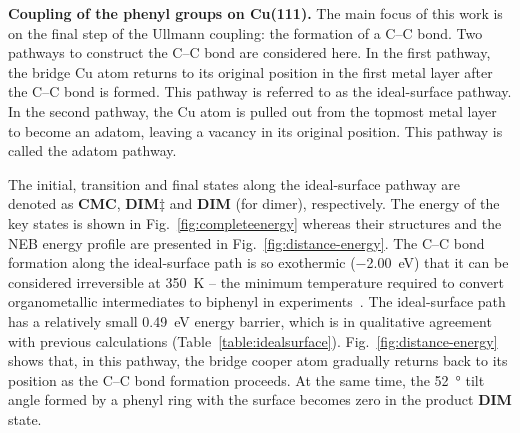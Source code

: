 \documentclass[journal=jacsat,manuscript=article]{achemso}
\newcommand{\lock}{\color{red}}
\newcommand{\lock}{\color{black}}
\begin{document}
{\lock
\textbf{Coupling of the phenyl groups on Cu(111).} The main focus of this work is on the final step of the Ullmann coupling: the formation of a C--C bond. 
Two pathways to construct the C--C bond are considered here. 
In the first pathway, the bridge Cu atom returns to its original position in the first metal layer after the C--C bond is formed. This pathway is referred to as the ideal-surface pathway.
In the second pathway, the Cu atom is pulled out from the topmost metal layer to become an adatom, leaving a vacancy in its original position. This pathway is called the adatom pathway.

The initial, transition and final states along the ideal-surface pathway are denoted as \textbf{CMC}, \textbf{DIM$\ddagger$} and \textbf{DIM} (for dimer), respectively.
The energy of the key states is shown in Fig.~\ref{fig:completeenergy} whereas their structures and the NEB energy profile are presented in Fig.~\ref{fig:distance-energy}. 
The C--C bond formation along the ideal-surface path is so exothermic (\SI{-2.00}{\electronvolt}) that it can be considered irreversible at \SI{350}{\kelvin} -- the minimum temperature required to convert organometallic intermediates to biphenyl in experiments~\cite{ullmann_67, sur_sci01}. The ideal-surface path has a relatively small \SI{0.49}{\electronvolt} energy barrier, which is in qualitative agreement with previous calculations (Table~\ref{table:idealsurface}). %
Fig.~\ref{fig:distance-energy} shows that, in this pathway, the bridge cooper atom gradually returns back to its position as the C--C bond formation proceeds. At the same time, the \SI{52}{\degree} tilt angle formed by a phenyl ring with the surface becomes zero in the product \textbf{DIM} state.

}
\end{document}
